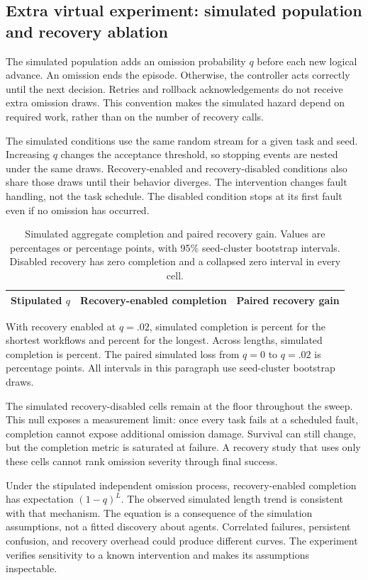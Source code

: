 \documentclass{article}
\begin{document}
\subsection{Extra virtual experiment: simulated population and recovery ablation}

The simulated population adds an omission probability $q$ before each new logical advance. An omission ends the episode. Otherwise, the controller acts correctly until the next decision. Retries and rollback acknowledgements do not receive extra omission draws. This convention makes the simulated hazard depend on required work, rather than on the number of recovery calls.\par
The simulated conditions use the same random stream for a given task and seed. Increasing $q$ changes the acceptance threshold, so stopping events are nested under the same draws. Recovery-enabled and recovery-disabled conditions also share those draws until their behavior diverges. The intervention changes fault handling, not the task schedule. The disabled condition stops at its first fault even if no omission has occurred.\par
\begin{table}[t]\centering
\caption{Simulated aggregate completion and paired recovery gain. Values are percentages or percentage points, with 95\% seed-cluster bootstrap intervals. Disabled recovery has zero completion and a collapsed zero interval in every cell.}\label{tab:simulation}
\begin{tabular}{rll}\toprule Stipulated $q$ & Recovery-enabled completion & Paired recovery gain\\\midrule
\end{tabular}\end{table}
With recovery enabled at $q=.02$, simulated completion is \SimShort{} percent for the shortest workflows and \SimLong{} percent for the longest. Across lengths, simulated completion is \SimAggregate{} percent. The paired simulated loss from $q=0$ to $q=.02$ is \HazardLoss{} percentage points. All intervals in this paragraph use seed-cluster bootstrap draws.\par
The simulated recovery-disabled cells remain at the floor throughout the sweep. This null exposes a measurement limit: once every task fails at a scheduled fault, completion cannot expose additional omission damage. Survival can still change, but the completion metric is saturated at failure. A recovery study that uses only these cells cannot rank omission severity through final success.\par
Under the stipulated independent omission process, recovery-enabled completion has expectation $(1-q)^L$. The observed simulated length trend is consistent with that mechanism. The equation is a consequence of the simulation assumptions, not a fitted discovery about agents. Correlated failures, persistent confusion, and recovery overhead could produce different curves. The experiment verifies sensitivity to a known intervention and makes its assumptions inspectable.\par
\end{document}
